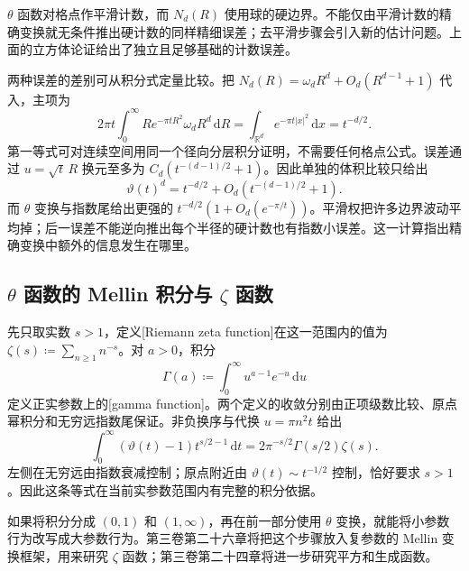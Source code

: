 \(\theta\) 函数对格点作平滑计数，而 \(N_d(R)\) 使用球的硬边界。不能仅由平滑计数的精确变换就无条件推出硬计数的同样精细误差；去平滑步骤会引入新的估计问题。上面的立方体论证给出了独立且足够基础的计数误差。

\ProseParagraphBreak

两种误差的差别可从积分式定量比较。把 \(N_d(R)=\omega_dR^d+O_d(R^{d-1}+1)\) 代入，主项为
\[
 2\pi t\int_0^\infty R e^{-\pi tR^2}\omega_dR^d\,\mathrm{d}R
 =\int_{\mathbb R^d}e^{-\pi t|x|^2}\,\mathrm{d}x=t^{-d/2}.
\]
第一等式可对连续空间用同一个径向分层积分证明，不需要任何格点公式。误差通过 \(u=\sqrt t\,R\) 换元至多为 \(C_d(t^{-(d-1)/2}+1)\)。因此单独的体积比较只给出
\[
 \vartheta(t)^d=t^{-d/2}+O_d(t^{-(d-1)/2}+1).
\]
而 \(\theta\) 变换与指数尾给出更强的 \(t^{-d/2}(1+O_d(e^{-\pi/t}))\)。平滑权把许多边界波动平均掉；后一误差不能逆向推出每个半径的硬计数也有指数小误差。这一计算指出精确变换中额外的信息发生在哪里。

\subsection{\texorpdfstring{\(\theta\)}{\AnalysisPdfTheta} 函数的 Mellin 积分与 \texorpdfstring{\(\zeta\)}{\AnalysisPdfZeta} 函数}
\label{b2:subsec:060303}

先只取实数 \(s>1\)，定义[Riemann zeta function]在这一范围内的值为 \(\zeta(s)\coloneqq\sum_{n\geq1}n^{-s}\)。对 \(a>0\)，积分
\[
 \Gamma(a)\coloneqq\int_0^\infty u^{a-1}e^{-u}\,\mathrm{d}u
\]
定义正实参数上的[gamma function]。两个定义的收敛分别由正项级数比较、原点幂积分和无穷远指数尾保证。非负换序与代换 \(u=\pi n^2t\) 给出
\[
 \int_0^\infty(\vartheta(t)-1)t^{s/2-1}\,\mathrm{d}t
 =2\pi^{-s/2}\Gamma(s/2)\zeta(s).
\]
左侧在无穷远由指数衰减控制；原点附近由 \(\vartheta(t)\sim t^{-1/2}\) 控制，恰好要求 \(s>1\)。因此这条等式在当前实参数范围内有完整的积分依据。

\ProseParagraphBreak

如果将积分分成 \((0,1)\) 和 \((1,\infty)\)，再在前一部分使用 \(\theta\) 变换，就能将小参数行为改写成大参数行为。第三卷第二十六章将把这个步骤放入复参数的 Mellin 变换框架，用来研究 \(\zeta\) 函数；第三卷第二十四章将进一步研究平方和生成函数。

\ProseParagraphBreak

